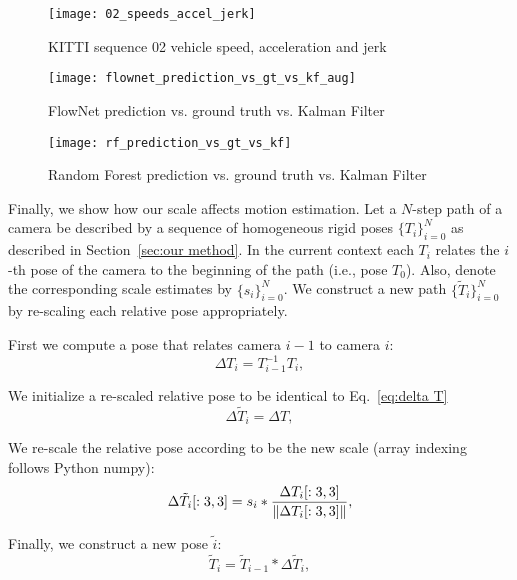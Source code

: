 \begin{figure}[!ht]
  \centering
  \texttt{[image: 02\_speeds\_accel\_jerk]}
  \caption{KITTI sequence 02 vehicle speed, acceleration and jerk}
  \label{fig:02 stats}
\end{figure}

\begin{figure}[!ht]
  \centering
  \texttt{[image: flownet\_prediction\_vs\_gt\_vs\_kf\_aug]}
  \caption{FlowNet prediction vs. ground truth vs. Kalman Filter}
  \label{fig:pred_vs_gt_vs_ekf_aug}
\end{figure}

\begin{figure}[!ht]
  \centering
  \texttt{[image: rf\_prediction\_vs\_gt\_vs\_kf]}
  \caption{Random Forest prediction vs. ground truth vs. Kalman Filter}
  \label{fig:rf_pred_vs_gt_vs_ekf}
\end{figure}

Finally, we show how our scale affects motion estimation.  Let a
$N$-step path of a camera be described by a sequence of homogeneous
rigid poses $\{T_i\}_{i=0}^N$ as described in Section~\ref{sec:our
  method}.  In the current context each $T_i$ relates the $i$-th pose
of the camera to the beginning of the path (i.e., pose $T_0$).  Also,
denote the corresponding scale estimates by $\{s_i\}_{i=0}^N$.  We
construct a new path $\{\tilde{T}_i\}_{i=0}^N$ by re-scaling each
relative pose appropriately.

First we compute a pose that relates camera $i-1$ to camera $i$:
\begin{equation}\label{eq:delta T}
  \Delta T_i = T_{i-1}^{-1}T_i,
\end{equation}

We initialize a re-scaled relative pose to be identical to Eq.~\ref{eq:delta T}
\begin{equation}
  \Delta \tilde{T}_i = \Delta T,
\end{equation}

We re-scale the relative pose according to be the new scale (array
indexing follows Python numpy):
\begin{equation}
  \Delta \tilde{T}_i[:3,3] = s_i * \frac{\Delta T_i[:3,3]}{\lVert\Delta T_i[:3,3]\rVert},
\end{equation}

Finally, we construct a new pose $\tilde{i}$:
\begin{equation}
  \tilde{T}_i = \tilde{T}_{i-1} * \Delta \tilde{T}_i,
\end{equation}

